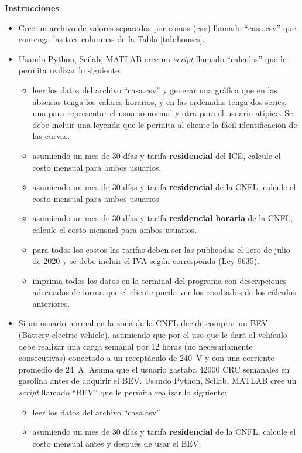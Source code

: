 \documentclass[12pt]{article}
\begin{document}
\noindent\textbf{Instrucciones}
\begin{itemize}
    \item Cree un archivo de valores separados por comas (csv) llamado ``casa.csv'' que contenga las tres columnas de la Tabla \ref{tab:houses}.
    \item Usando Python, Scilab, MATLAB cree un \emph{script} llamado ``calculos'' que le permita realizar lo siguiente:
    \begin{itemize}
        \item leer los datos del archivo ``casa.csv'' y generar una gráfica que en las abscisas tenga los valores horarios, y en las ordenadas tenga dos series, una para representar el usuario normal y otra para el usuario atípico. Se debe incluir una leyenda que le permita al cliente la fácil identificación de las curvas.
        \item asumiendo un mes de 30 días y tarifa \textbf{residencial} del ICE, calcule el costo mensual para ambos usuarios.
        \item asumiendo un mes de 30 días y tarifa \textbf{residencial} de la CNFL, calcule el costo mensual para ambos usuarios.
        \item asumiendo un mes de 30 días y tarifa \textbf{residencial horaria} de la CNFL, calcule el costo mensual para ambos usuarios.
        \item para todos los costos las tarifas deben ser las publicadas el 1ero de julio de 2020 y se debe incluir el IVA según corresponda (Ley 9635).
        \item imprima todos los datos en la terminal del programa con descripciones adecuadas de forma que el cliente pueda ver los resultados de los cálculos anteriores.
    \end{itemize}
    \item Si un usuario normal en la zona de la CNFL decide comprar un BEV (Battery electric vehicle), asumiendo que por el uso que le dará al vehículo debe realizar una carga semanal por 12 horas (no necesariamente consecutivas) conectado a un receptáculo de \SI{240}{\volt} y con una corriente promedio de \SI{24}{\ampere}. Asuma que el usuario gastaba 42000 CRC semanales en gasolina antes de adquirir el BEV. Usando Python, Scilab, MATLAB cree un \emph{script} llamado ``BEV'' que le permita realizar lo siguiente:
    \begin{itemize}
        \item leer los datos del archivo ``casa.csv''
        \item asumiendo un mes de 30 días y tarifa \textbf{residencial} de la CNFL, calcule el costo mensual antes y después de usar el BEV.

\end{itemize}
\end{itemize}
\end{document}
